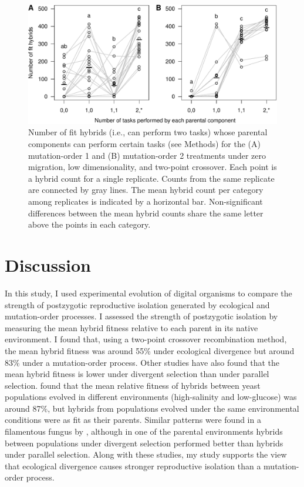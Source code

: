 \begin{doublespace}
\begin{figure}
\centering
\includegraphics[width=0.95\linewidth]{fit_hybrid_components.pdf}
\caption{Number of fit hybrids (i.e., can perform two tasks)
  whose parental components can perform certain tasks (see Methods)
  for the (A) mutation-order 1 and (B) mutation-order 2 treatments
  under zero migration, low dimensionality, and two-point crossover.
  Each point is a hybrid count for a single replicate.
  Counts from the same replicate are connected by gray lines.
  The mean hybrid count per category among replicates
  is indicated by a horizontal bar.
  Non-significant differences between the mean hybrid counts
  share the same letter above the points in each category.}
\label{fit_hybrid_components}
\end{figure}



\section{Discussion}

In this study, I used experimental evolution of digital organisms
to compare the strength of postzygotic reproductive isolation
generated by ecological and mutation-order processes.
%
I assessed the strength of postzygotic isolation
by measuring the mean hybrid fitness relative to each parent
in its native environment.
%
I found that, using a two-point crossover recombination method,
the mean hybrid fitness was around 55\% under ecological divergence
but around 83\% under a mutation-order process.
%
Other studies have also found that the mean hybrid fitness
is lower under divergent selection than under parallel selection.
%
\citet{det07} found that the mean relative fitness of hybrids
between yeast populations evolved in different environments
(high-salinity and low-glucose) was around 87\%,
but hybrids from populations evolved
under the same environmental conditions were as fit as their parents.
%
Similar patterns were found in a filamentous fungus by \citet{det08},
although in one of the parental environments
hybrids between populations under divergent selection
performed better than hybrids under parallel selection.
%
Along with these studies, my study supports
the view that ecological divergence causes
stronger reproductive isolation than a mutation-order process.




\end{doublespace}
